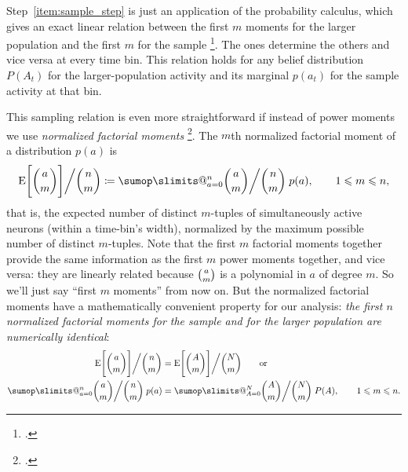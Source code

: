 \documentclass[\ifafour a4paper,12pt,\else a5paper,10pt,\fi%
onecolumn,oneside,article,%
british%
]{memoir}
\makeatletter
\theoremstyle{remark}
\theoremstyle{innote}
\def\sum{\DOTSI\sumop\slimits@}
\newcommand*{\citep}{\footcites}
\newcommand*{\defd}{\coloneqq}
\renewcommand*{\le}{\leqslant}%
\newcommand*{\E}{\mathrm{E}}
\renewcommand*{\|}{\nonscript\,\vert\nonscript\;\mathopen{}}
\newcommand*{\eqns}{eqs}%
\newcommand*{\yAv}{A}
\newcommand*{\yav}{a}
\newcommand*{\ya}{\yav}%
\newcommand*{\yA}{\yAv}%
\newcommand*{\yH}{\varIota}
\newcommand*{\px}{P_{\text{me}}}
\newcommand*{\pxx}{p}
\newcommand*{\pxxx}{P}
\makeatother
\begin{document}
\medskip

Step~\ref{item:sample_step} is just an application of the probability
calculus, which gives an exact linear relation between the first $m$
moments for the larger population and the first $m$ for the sample
\citep[\eqns~(16)]{portamanaetal2015}. The ones determine the others and
vice versa at every time bin. This relation holds for any belief
distribution $\pxxx(\yA_{t})$ for the larger-population activity and its
marginal $\pxx(\ya_{t})$ for the sample activity at that bin.

This sampling relation is even more straightforward if instead of power
moments we use \emph{normalized factorial moments} \citep{potts1953}. The
$m$th normalized factorial moment of a distribution $\pxx(\ya)$ is
\begin{equation}
  \label{eq:def_factorial_moment_a}
  \E\Biggl[\binom{\ya}{m} \Biggr]\bigg/\binom{n}{m}
  \defd
  \sum_{\ya=0}^{n} %
  \displaystyle\binom{\ya}{m} \bigg/ \binom{n}{m}\; \pxx(\ya),
  \qquad 1\le m \le n,
\end{equation}
that is, the expected number of distinct $m$-tuples of simultaneously
active neurons (within a time-bin's width), normalized by the maximum
possible number of distinct $m$-tuples. %
Note that the first $m$ factorial moments together provide the same
information as the first $m$ power moments together, and vice versa: they
are linearly related because $\tbinom{\ya}{m}$ is a polynomial in $\ya$ of
degree $m$. So we'll just say \enquote{first $m$ moments} from now
on. %
But the normalized factorial moments have a mathematically convenient
property for our analysis: \emph{the first $n$ normalized factorial moments
  for the sample and for the larger population are numerically identical}:
\begin{equation}
  \label{eq:equal_m_factorialmoments}
  \begin{split}
  \E\Biggl[\binom{\ya}{m} \Biggr]\bigg/\binom{n}{m}
  &=
  \E\Biggl[\binom{\yA}{m} \Biggr]\bigg/\binom{N}{m}
  \qquad\text{or}\\
    \sum_{\ya=0}^{n} %
  \binom{\ya}{m}\bigg/  \binom{n}{m}\; \pxx(\ya)
&=    \sum_{\yA=0}^{N} %
  \binom{\yA}{m}\bigg/  \binom{N}{m}\; \pxxx(\yA),\qquad
  1\le m \le n.
\end{split}
\end{equation}
\end{document}
